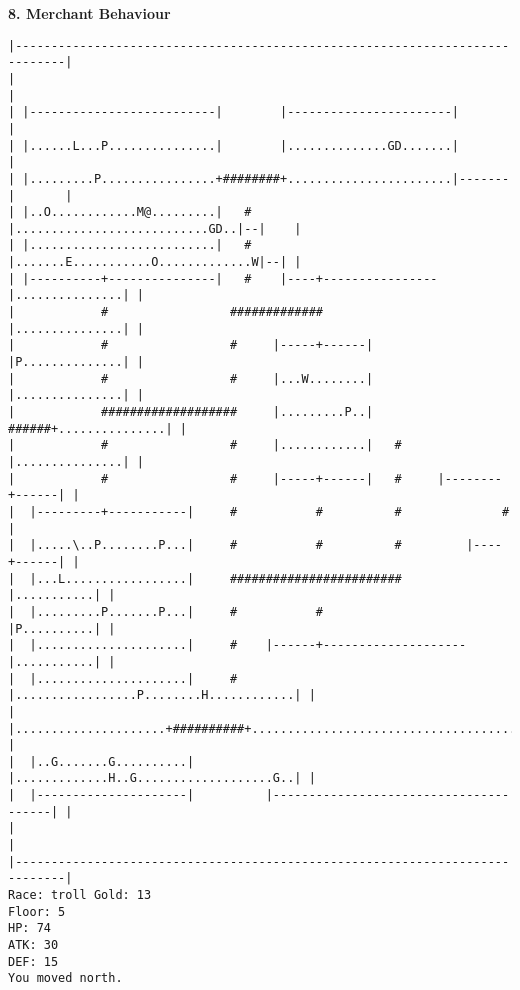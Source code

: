 \documentclass[11pt]{article}
\theoremstyle{plain}
\begin{document}
\textbf{8. Merchant Behaviour}

\begin{Verbatim}[fontsize=\small]
|-----------------------------------------------------------------------------|
|                                                                             |
| |--------------------------|        |-----------------------|               |
| |......L...P...............|        |..............GD.......|               |
| |.........P................+########+.......................|-------|       |
| |..O............M@.........|   #    |...........................GD..|--|    |
| |..........................|   #    |.......E...........O.............W|--| |
| |----------+---------------|   #    |----+----------------|...............| |
|            #                 #############                |...............| |
|            #                 #     |-----+------|         |P..............| |
|            #                 #     |...W........|         |...............| |
|            ###################     |.........P..|   ######+...............| |
|            #                 #     |............|   #     |...............| |
|            #                 #     |-----+------|   #     |--------+------| |
|  |---------+-----------|     #           #          #              #        |
|  |.....\..P........P...|     #           #          #         |----+------| |
|  |...L.................|     ########################         |...........| |
|  |.........P.......P...|     #           #                    |P..........| |
|  |.....................|     #    |------+--------------------|...........| |
|  |.....................|     #    |.................P........H............| |
|  |.....................+##########+.......................................| |
|  |..G.......G..........|          |.............H..G...................G..| |
|  |---------------------|          |---------------------------------------| |
|                                                                             |
|-----------------------------------------------------------------------------|
Race: troll Gold: 13                                                   Floor: 5
HP: 74
ATK: 30
DEF: 15
You moved north.
\end{Verbatim}
\end{document}
